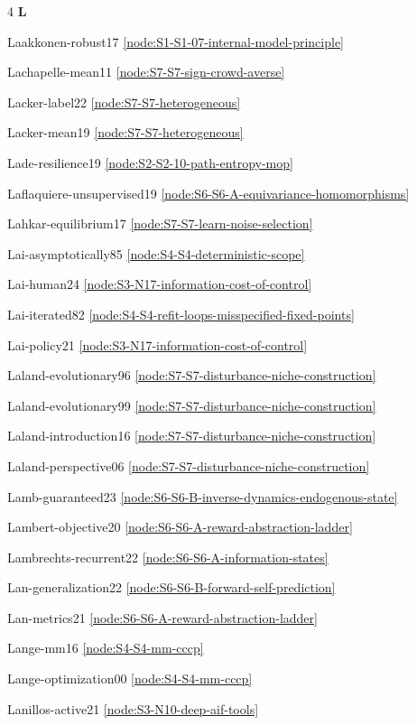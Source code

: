 \documentclass[10pt]{article}
\begin{document}
{\begin{multicols}{4}
\smallskip\textbf{L}\par
Laakkonen-robust17 \hfill \ref{node:S1-S1-07-internal-model-principle}\par
Lachapelle-mean11 \hfill \ref{node:S7-S7-sign-crowd-averse}\par
Lacker-label22 \hfill \ref{node:S7-S7-heterogeneous}\par
Lacker-mean19 \hfill \ref{node:S7-S7-heterogeneous}\par
Lade-resilience19 \hfill \ref{node:S2-S2-10-path-entropy-mop}\par
Laflaquiere-unsupervised19 \hfill \ref{node:S6-S6-A-equivariance-homomorphisms}\par
Lahkar-equilibrium17 \hfill \ref{node:S7-S7-learn-noise-selection}\par
Lai-asymptotically85 \hfill \ref{node:S4-S4-deterministic-scope}\par
Lai-human24 \hfill \ref{node:S3-N17-information-cost-of-control}\par
Lai-iterated82 \hfill \ref{node:S4-S4-refit-loops-misspecified-fixed-points}\par
Lai-policy21 \hfill \ref{node:S3-N17-information-cost-of-control}\par
Laland-evolutionary96 \hfill \ref{node:S7-S7-disturbance-niche-construction}\par
Laland-evolutionary99 \hfill \ref{node:S7-S7-disturbance-niche-construction}\par
Laland-introduction16 \hfill \ref{node:S7-S7-disturbance-niche-construction}\par
Laland-perspective06 \hfill \ref{node:S7-S7-disturbance-niche-construction}\par
Lamb-guaranteed23 \hfill \ref{node:S6-S6-B-inverse-dynamics-endogenous-state}\par
Lambert-objective20 \hfill \ref{node:S6-S6-A-reward-abstraction-ladder}\par
Lambrechts-recurrent22 \hfill \ref{node:S6-S6-A-information-states}\par
Lan-generalization22 \hfill \ref{node:S6-S6-B-forward-self-prediction}\par
Lan-metrics21 \hfill \ref{node:S6-S6-A-reward-abstraction-ladder}\par
Lange-mm16 \hfill \ref{node:S4-S4-mm-cccp}\par
Lange-optimization00 \hfill \ref{node:S4-S4-mm-cccp}\par
Lanillos-active21 \hfill \ref{node:S3-N10-deep-aif-tools}\par

\end{multicols}}
\end{document}
